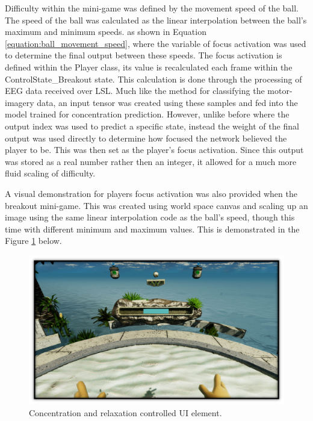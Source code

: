 \documentclass[11pt, a4paper]{article}
\newcommand{\reffigure}[1]{Figure \ref{#1}}
\newcommand{\refequation}[1]{Equation \ref{#1}}
\begin{document}
\pagebreak

Difficulty within the mini-game was defined by the movement speed of the ball. The speed of the ball was calculated as the linear interpolation between the ball's maximum and minimum speeds. as shown in \refequation{equation:ball_movement_speed}, where the variable of focus activation was used to determine the final output between these speeds. The focus activation is defined within the Player class, its value is recalculated each frame within the ControlState\_Breakout state. This calculation is done through the processing of EEG data received over LSL. Much like the method for classifying the motor-imagery data, an input tensor was created using these samples and fed into the model trained for concentration prediction. However, unlike before where the output index was used to predict a specific state, instead the weight of the final output was used directly to determine how focused the network believed the player to be. This was then set as the player's focus activation. Since this output was stored as a real number rather then an integer, it allowed for a much more fluid scaling of difficulty. 

\hfill

A visual demonstration for players focus activation was also provided when the breakout mini-game. This was created using world space canvas and scaling up an image using the same linear interpolation code as the ball's speed, though this time with different minimum and maximum values. This is demonstrated in the \reffigure{fig:focus_bar} below.


\begin{figure}[H]
	\centering
	\includegraphics[width = 0.9 \linewidth] {[ Figures ]/Concentration UI.png}
	\captionsetup{font = small, labelfont = small, width=.8\linewidth}
	\caption{Concentration and relaxation controlled UI element.}
	\label{fig:focus_bar}
\end{figure}
\end{document}
